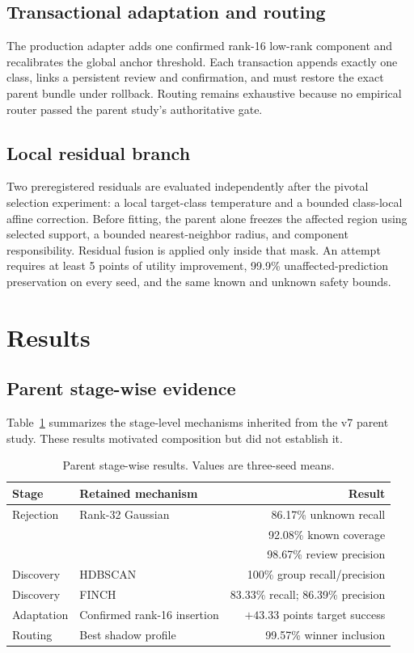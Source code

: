 \documentclass[10pt]{article}
\begin{document}
\subsection{Transactional adaptation and routing}

The production adapter adds one confirmed rank-16 low-rank component and
recalibrates the global anchor threshold. Each transaction appends exactly one
class, links a persistent review and confirmation, and must restore the exact
parent bundle under rollback. Routing remains exhaustive because no empirical
router passed the parent study's authoritative gate.

\subsection{Local residual branch}

Two preregistered residuals are evaluated independently after the pivotal
selection experiment: a local target-class temperature and a bounded
class-local affine correction. Before fitting, the parent alone freezes the
affected region using selected support, a bounded nearest-neighbor radius, and
component responsibility. Residual fusion is applied only inside that mask.
An attempt requires at least 5 points of utility improvement, 99.9\%
unaffected-prediction preservation on every seed, and the same known and
unknown safety bounds.

\section{Results}

\subsection{Parent stage-wise evidence}

Table~\ref{tab:parent} summarizes the stage-level mechanisms inherited from the
v7 parent study. These results motivated composition but did not establish it.

\begin{table}[t]
\centering
\caption{Parent stage-wise results. Values are three-seed means.}
\label{tab:parent}
\begin{tabular}{llr}
\toprule
Stage & Retained mechanism & Result \\
\midrule
Rejection & Rank-32 Gaussian & 86.17\% unknown recall \\
           &                  & 92.08\% known coverage \\
           &                  & 98.67\% review precision \\
Discovery & HDBSCAN          & 100\% group recall/precision \\
Discovery & FINCH            & 83.33\% recall; 86.39\% precision \\
Adaptation & Confirmed rank-16 insertion & $+43.33$ points target success \\
Routing & Best shadow profile & 99.57\% winner inclusion \\
\bottomrule
\end{tabular}
\end{table}
\end{document}
